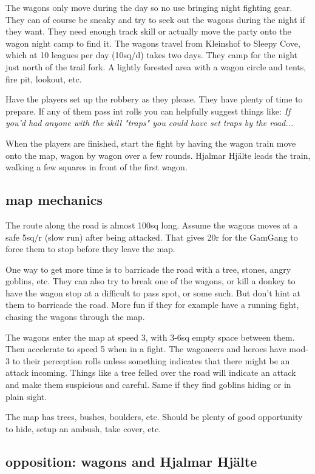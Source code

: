 The wagons only move during the day so no use bringing night fighting gear. They can of course be sneaky and try to seek out the wagons during the night if they want. They need enough track skill or actually move the party onto the wagon night camp to find it. The wagons travel from Kleinshof to Sleepy Cove, which at 10 leagues per day (10sq/d) takes two days. They camp for the night just north of the trail fork. A lightly forested area with a wagon circle and tents, fire pit, lookout, etc.

Have the players set up the robbery as they please. They have plenty of time to prepare. If any of them pass int rolls you can helpfully suggest things like: \emph{If you'd had anyone with the skill "traps" you could have set traps by the road...}

When the players are finished, start the fight by having the wagon train move onto the map, wagon by wagon over a few rounds. Hjalmar Hjälte leads the train, walking a few squares in front of the first wagon.


\subsection*{map mechanics}

The route along the road is almost 100sq long. Assume the wagons moves at a safe 5sq/r (slow run) after being attacked. That gives 20r for the GamGang to force them to stop before they leave the map.

One way to get more time is to barricade the road with a tree, stones, angry goblins, etc. They can also try to break one of the wagons, or kill a donkey to have the wagon stop at a difficult to pass spot, or some such. But don't hint at them to barricade the road. More fun if they for example have a running fight, chasing the wagons through the map.

The wagons enter the map at speed 3, with 3-6sq empty space between them. Then accelerate to speed 5 when in a fight. The wagoneers and heroes have mod-3 to their perception rolls unless something indicates that there might be an attack incoming. Things like a tree felled over the road will indicate an attack and make them suspicious and careful. Same if they find goblins hiding or in plain sight.

The map has trees, bushes, boulders, etc. Should be plenty of good opportunity to hide, setup an ambush, take cover, etc.


\subsection*{opposition: wagons and Hjalmar Hjälte}

